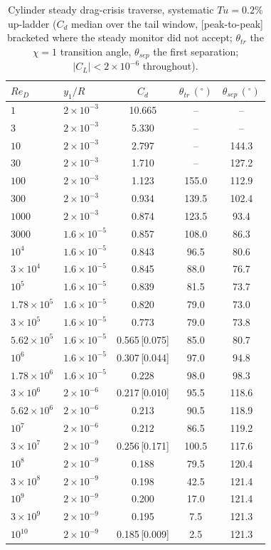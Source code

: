 \begin{table}[H]
  \centering\small
  \caption{Cylinder steady drag-crisis traverse, systematic $Tu\!=\!0.2\%$ up-ladder ($C_d$ median over the tail window, [peak-to-peak] bracketed where the steady monitor did not accept; $\theta_{tr}$ the $\chi\!=\!1$ transition angle, $\theta_{sep}$ the first separation; $|C_L|\!<\!2\times10^{-6}$ throughout).}
  \label{t:dragcrisis}
  \begin{tabular}{l l c cc}
    \toprule
    $Re_D$ & $y_1/R$ & $C_d$ & $\theta_{tr}\,(^\circ)$ & $\theta_{sep}\,(^\circ)$ \\
    \midrule
    $1$ & $2\times10^{-3}$ & 10.665 & -- & -- \\
    $3$ & $2\times10^{-3}$ & 5.330 & -- & -- \\
    $10$ & $2\times10^{-3}$ & 2.797 & -- & 144.3 \\
    $30$ & $2\times10^{-3}$ & 1.710 & -- & 127.2 \\
    $100$ & $2\times10^{-3}$ & 1.123 & 155.0 & 112.9 \\
    $300$ & $2\times10^{-3}$ & 0.934 & 139.5 & 102.4 \\
    $1000$ & $2\times10^{-3}$ & 0.874 & 123.5 & 93.4 \\
    $3000$ & $1.6\times10^{-5}$ & 0.857 & 108.0 & 86.3 \\
    $10^{4}$ & $1.6\times10^{-5}$ & 0.843 & 96.5 & 80.6 \\
    $3\!\times\!10^{4}$ & $1.6\times10^{-5}$ & 0.845 & 88.0 & 76.7 \\
    $10^{5}$ & $1.6\times10^{-5}$ & 0.839 & 81.5 & 73.7 \\
    $1.78\!\times\!10^{5}$ & $1.6\times10^{-5}$ & 0.820 & 79.0 & 73.0 \\
    $3\!\times\!10^{5}$ & $1.6\times10^{-5}$ & 0.773 & 79.0 & 73.8 \\
    $5.62\!\times\!10^{5}$ & $1.6\times10^{-5}$ & 0.565\,[0.075] & 85.0 & 80.7 \\
    $10^{6}$ & $1.6\times10^{-5}$ & 0.307\,[0.044] & 97.0 & 94.8 \\
    $1.78\!\times\!10^{6}$ & $1.6\times10^{-5}$ & 0.228 & 98.0 & 98.3 \\
    $3\!\times\!10^{6}$ & $2\times10^{-6}$ & 0.217\,[0.010] & 95.5 & 118.6 \\
    $5.62\!\times\!10^{6}$ & $2\times10^{-6}$ & 0.213 & 90.5 & 118.9 \\
    $10^{7}$ & $2\times10^{-6}$ & 0.212 & 86.5 & 119.2 \\
    $3\!\times\!10^{7}$ & $2\times10^{-9}$ & 0.256\,[0.171] & 100.5 & 117.6 \\
    $10^{8}$ & $2\times10^{-9}$ & 0.188 & 79.5 & 120.4 \\
    $3\!\times\!10^{8}$ & $2\times10^{-9}$ & 0.198 & 42.5 & 121.4 \\
    $10^{9}$ & $2\times10^{-9}$ & 0.200 & 17.0 & 121.4 \\
    $3\!\times\!10^{9}$ & $2\times10^{-9}$ & 0.195 & 7.5 & 121.3 \\
    $10^{10}$ & $2\times10^{-9}$ & 0.185\,[0.009] & 2.5 & 121.3 \\
    \bottomrule
  \end{tabular}
\end{table}
